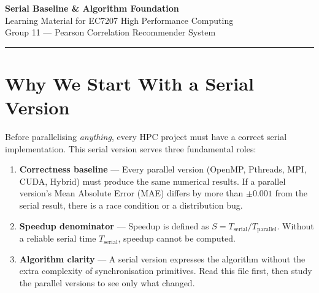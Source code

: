 \documentclass[12pt,a4paper]{article}
\begin{document}

\begin{center}
    {\LARGE\bfseries Serial Baseline \& Algorithm Foundation}\\[0.5em]
    {\large Learning Material for EC7207 High Performance Computing}\\[0.3em]
    {\normalsize Group 11 — Pearson Correlation Recommender System}
\end{center}
\vspace{1em}
\hrule
\vspace{1.5em}

\section{Why We Start With a Serial Version}

Before parallelising \emph{anything}, every HPC project must have a correct
serial implementation.  This serial version serves three fundamental roles:

\begin{enumerate}
    \item \textbf{Correctness baseline} — Every parallel version (OpenMP,
          Pthreads, MPI, CUDA, Hybrid) must produce the same numerical results.
          If a parallel version's Mean Absolute Error (MAE) differs by more than
          $\pm 0.001$ from the serial result, there is a race condition or a
          distribution bug.
    \item \textbf{Speedup denominator} — Speedup is defined as
          $S = T_{\text{serial}} / T_{\text{parallel}}$.  Without a reliable
          serial time $T_{\text{serial}}$, speedup cannot be computed.
    \item \textbf{Algorithm clarity} — A serial version expresses the algorithm
          without the extra complexity of synchronisation primitives.  Read this
          file first, then study the parallel versions to see only what changed.
\end{enumerate}

\begin{center}
\end{center}
\end{document}
